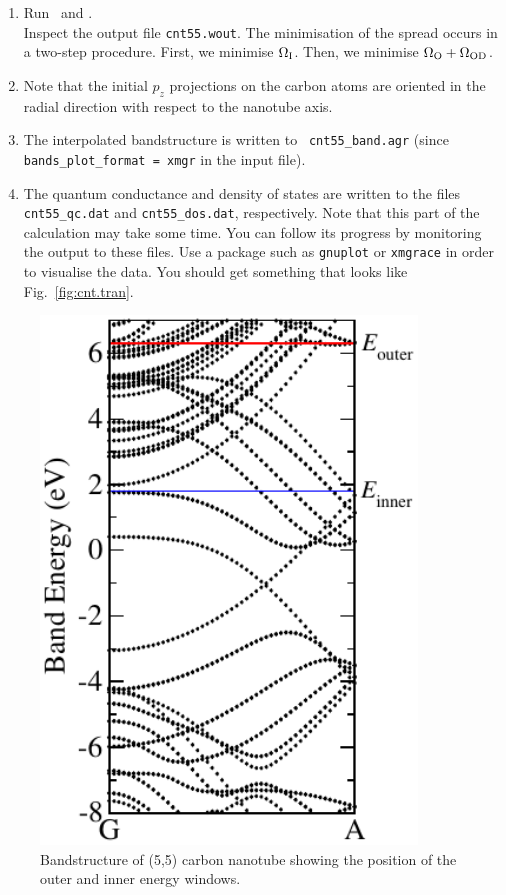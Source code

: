\documentclass[a4paper,11pt,twoside]{article}
\begin{document}
\begin{enumerate}
\item Run \pwscf\ and \wannier.\\
Inspect the output file {\tt cnt55.wout}. The minimisation of the
spread occurs in a two-step procedure. First, we minimise $\Omega_{\rm
  I}$. Then, we minimise $\Omega_{\rm O}+\Omega_{{\rm OD}}$.
\item Note that the initial $p_{z}$ projections on the carbon atoms
are oriented in the radial direction with respect to the nanotube
axis.
\item The interpolated bandstructure is written to {\tt
cnt55\_band.agr} (since {\tt bands\_plot\_format = xmgr} in the input
file).
\item The quantum conductance and density of states are written to the
files {\tt cnt55\_qc.dat} and {\tt cnt55\_dos.dat}, respectively. 
Note that this part of the calculation may take some time. You can 
follow its progress by monitoring the output to these files. 
Use a package such as {\tt gnuplot} or {\tt xmgrace} in order to visualise
the data. You should get something that looks like Fig.~\ref{fig:cnt.tran}.
\end{enumerate}

\begin{figure}[h]
\begin{center}
\includegraphics[width=10cm]{cnt_win}
\caption{Bandstructure of (5,5) carbon nanotube showing the position
  of the outer and inner energy windows.}
\label{fig:cnt.win}
\end{center}
\end{figure}
\end{document}
